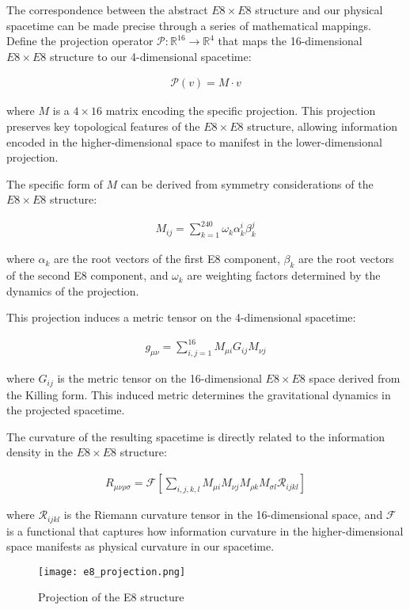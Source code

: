 \documentclass[11pt,english,twoside]{article}
\begin{document}
The correspondence between the abstract $E8\times E8$ structure and our physical spacetime can be made precise through a series of mathematical mappings. Define the projection operator $\mathcal{P}: \mathbb{R}^{16} \rightarrow \mathbb{R}^{4}$ that maps the 16-dimensional $E8\times E8$ structure to our 4-dimensional spacetime:

\begin{align}
\mathcal{P}(v) = M \cdot v
\end{align}

where $M$ is a $4 \times 16$ matrix encoding the specific projection. This projection preserves key topological features of the $E8\times E8$ structure, allowing information encoded in the higher-dimensional space to manifest in the lower-dimensional projection.

The specific form of $M$ can be derived from symmetry considerations of the $E8\times E8$ structure:

\begin{align}
M_{ij} = \sum_{k=1}^{240} \omega_k \alpha_k^i \beta_k^j
\end{align}

where $\alpha_k$ are the root vectors of the first E8 component, $\beta_k$ are the root vectors of the second E8 component, and $\omega_k$ are weighting factors determined by the dynamics of the projection.

This projection induces a metric tensor on the 4-dimensional spacetime:

\begin{align}
g_{\mu\nu} = \sum_{i,j=1}^{16} M_{\mu i} G_{ij} M_{\nu j}
\end{align}

where $G_{ij}$ is the metric tensor on the 16-dimensional $E8\times E8$ space derived from the Killing form. This induced metric determines the gravitational dynamics in the projected spacetime.

The curvature of the resulting spacetime is directly related to the information density in the $E8\times E8$ structure:

\begin{align}
R_{\mu\nu\rho\sigma} = \mathcal{F}\left[\sum_{i,j,k,l} M_{\mu i} M_{\nu j} M_{\rho k} M_{\sigma l} \mathcal{R}_{ijkl}\right]
\end{align}

where $\mathcal{R}_{ijkl}$ is the Riemann curvature tensor in the 16-dimensional space, and $\mathcal{F}$ is a functional that captures how information curvature in the higher-dimensional space manifests as physical curvature in our spacetime.
\begin{wrapfigure}{r}{0.25\textwidth}
    \centering
    \texttt{[image: e8\_projection.png]}
    \caption{Projection of the E8 structure}
    \label{fig:e8_projection}
    \end{wrapfigure}
    
\end{document}
